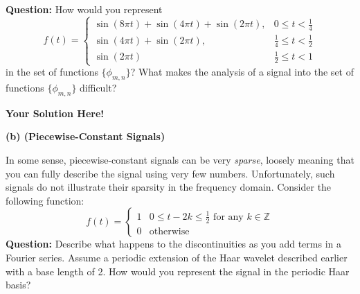 \documentclass[12pt]{article}
\newcommand{\x}{\mathbf{x}}
\newcommand{\0}{\mathbf{0}}
\newcommand{\solspace}{\vspace{3mm} \textbf{Your Solution Here!} \vspace{3mm}}
\begin{document}
\textbf{Question: } How would you represent
\begin{equation}
f(t) = 
\begin{cases}
\sin(8\pi t) + \sin(4\pi t) + \sin(2\pi t), & 0 \leq t < \frac{1}{4} \\
\sin(4\pi t) + \sin(2\pi t), & \frac{1}{4} \leq t < \frac{1}{2} \\
\sin(2 \pi t) & \frac{1}{2} \leq t < 1
\end{cases}
\end{equation}
in the set of functions  $\{\phi_{m,n}\}$? What makes the analysis of a signal into the set of functions $\{\phi_{m,n}\}$ difficult?



\solspace

\textbf{(b) (Piecewise-Constant Signals)} 

In some sense, piecewise-constant signals can be very \textit{sparse}, loosely meaning that you can fully describe the signal using very few numbers.
Unfortunately, such signals do not illustrate their sparsity in the frequency domain.
Consider the following function:
\begin{equation}
f(t) = \begin{cases}
1 & 0 \leq t - 2 k \leq \frac{1}{2} \text{ for any } k \in \mathbb{Z} \\
0 & \text{otherwise}
\end{cases}
\end{equation}
\textbf{Question:} Describe what happens to the discontinuities as you add terms in a Fourier series.
Assume a periodic extension of the Haar wavelet described earlier with a base length of 2.
How would you represent the signal in the periodic Haar basis?
\end{document}
